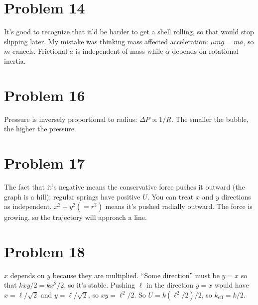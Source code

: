 \documentclass[11pt]{article}
\begin{document}
\section*{Problem 14}
It’s good to recognize that it’d be harder to get a shell rolling, so that would stop slipping later.
My mistake was thinking mass affected acceleration: $\mu mg=ma$, so $m$ cancels.
Frictional $a$ is independent of mass while $\alpha$ depends on rotational inertia.


\section*{Problem 16}
Pressure is inversely proportional to radius: $\Delta P \propto 1/R$.
The smaller the bubble, the higher the pressure.

\section*{Problem 17}
The fact that it’s negative means the conservative force pushes it outward (the graph is a hill); regular springs have positive $U$.
You can treat $x$ and $y$ directions as independent.
$x^2+y^2(=r^2)$ means it’s pushed radially outward.
The force is growing, so the trajectory will approach a line.

\section*{Problem 18}
$x$ depends on $y$ because they are multiplied.
``Some direction'' must be $y=x$ so that $kxy/2=kx^2/2$, so it’s stable.
Pushing $\ell$ in the direction $y=x$ would have $x=\ell/\sqrt{2}$ and $y=\ell/\sqrt{2}$, so $xy=\ell^2/2$.
So $U=k(\ell^2/2)/2$, so $k_{\mathrm{eff}}=k/2$.

\begin{center}
\end{center}
\end{document}
